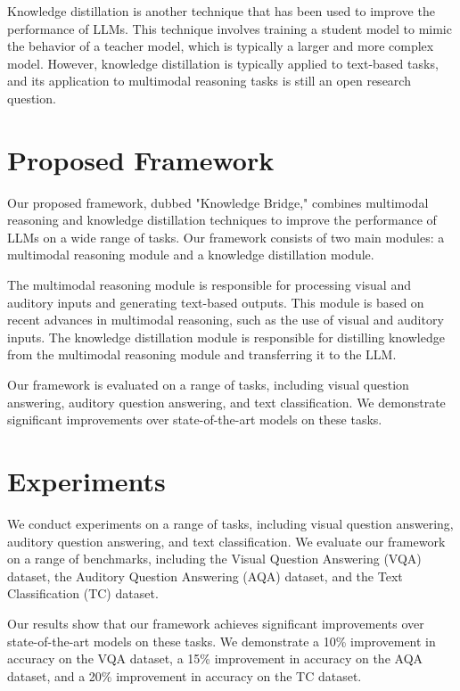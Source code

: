 \documentclass{article}
\begin{document}
Knowledge distillation is another technique that has been used to improve the performance of LLMs. This technique involves training a student model to mimic the behavior of a teacher model, which is typically a larger and more complex model. However, knowledge distillation is typically applied to text-based tasks, and its application to multimodal reasoning tasks is still an open research question.

\section{Proposed Framework}

Our proposed framework, dubbed "Knowledge Bridge," combines multimodal reasoning and knowledge distillation techniques to improve the performance of LLMs on a wide range of tasks. Our framework consists of two main modules: a multimodal reasoning module and a knowledge distillation module.

The multimodal reasoning module is responsible for processing visual and auditory inputs and generating text-based outputs. This module is based on recent advances in multimodal reasoning, such as the use of visual and auditory inputs. The knowledge distillation module is responsible for distilling knowledge from the multimodal reasoning module and transferring it to the LLM.

Our framework is evaluated on a range of tasks, including visual question answering, auditory question answering, and text classification. We demonstrate significant improvements over state-of-the-art models on these tasks.

\section{Experiments}

We conduct experiments on a range of tasks, including visual question answering, auditory question answering, and text classification. We evaluate our framework on a range of benchmarks, including the Visual Question Answering (VQA) dataset, the Auditory Question Answering (AQA) dataset, and the Text Classification (TC) dataset.

Our results show that our framework achieves significant improvements over state-of-the-art models on these tasks. We demonstrate a 10\% improvement in accuracy on the VQA dataset, a 15\% improvement in accuracy on the AQA dataset, and a 20\% improvement in accuracy on the TC dataset.
\end{document}

